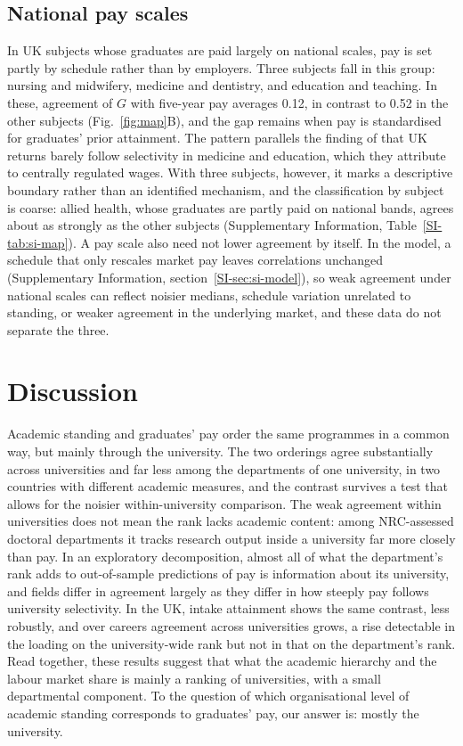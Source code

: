 \documentclass[11pt]{article}
\newcommand{\SIsec}[1]{Supplementary Information, section~\ref{SI-#1}}
\newcommand{\SItab}[1]{Supplementary Information, Table~\ref{SI-#1}}
\begin{document}
\subsection*{National pay scales}

In UK subjects whose graduates are paid largely on national scales, pay is set partly by schedule rather than by
employers. Three subjects fall in this group: nursing and midwifery, medicine and dentistry, and education and
teaching. In these, agreement of $G$ with five-year pay averages 0.12, in contrast to 0.52 in the other subjects
(Fig.~\ref{fig:map}B), and the gap remains when pay is standardised for graduates' prior attainment. The pattern
parallels the finding of \citet{britton2022how} that UK returns barely follow selectivity in medicine and education,
which they attribute to centrally regulated wages. With three subjects, however, it marks a descriptive boundary rather
than an identified mechanism, and the classification by subject is coarse: allied health, whose graduates are partly
paid on national bands, agrees about as strongly as the other subjects (\SItab{tab:si-map}). A pay scale also need not
lower agreement by itself. In the model, a schedule that only rescales market pay leaves correlations unchanged
(\SIsec{sec:si-model}), so weak agreement under national scales can reflect noisier medians, schedule variation
unrelated to standing, or weaker agreement in the underlying market, and these data do not separate the three.

\section*{Discussion}

Academic standing and graduates' pay order the same programmes in a common way, but mainly through the university.
The two orderings agree substantially across universities and far less among the departments of one university, in
two countries with different academic measures, and the contrast survives a test that allows for the noisier
within-university comparison. The weak agreement within universities does not mean the rank lacks academic content:
among NRC-assessed doctoral departments it tracks research output inside a university far more closely than pay. In an
exploratory decomposition, almost all of what the department's rank adds to out-of-sample predictions of pay is
information about its university, and fields differ in agreement largely as they differ in how steeply pay follows
university selectivity. In the UK, intake attainment shows the same contrast, less robustly, and over careers agreement
across universities grows, a rise detectable in the loading on the university-wide rank but not in that on the
department's rank. Read together, these results suggest that what the
academic hierarchy and the labour market share is mainly a ranking of universities, with a small departmental
component. To the question of which organisational level of academic standing corresponds to graduates'
pay, our answer is: mostly the university.
\end{document}
